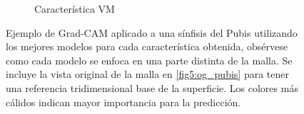 \begin{figure}[p]
\begin{subfigure}{0.4\textwidth}
        \caption{Característica VM}
        \label{fig5:grad_vm}
    \end{subfigure}
    \caption{Ejemplo de Grad-CAM aplicado a una sínfisis del Pubis utilizando los mejores modelos para cada característica obtenida, obsérvese como cada modelo se enfoca en una parte distinta de la malla. Se incluye la vista original de la malla en \ref{fig5:og_pubis} para tener una referencia tridimensional base de la superficie. Los colores más cálidos indican mayor importancia para la predicción.}
    \label{fig5:grad_cam__diff_chars}
\end{figure}